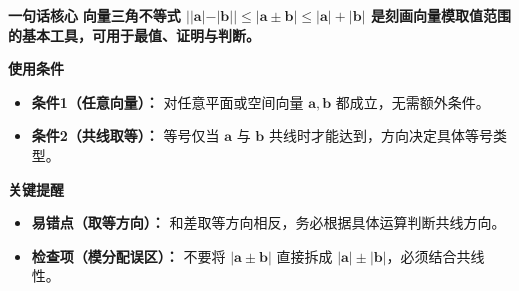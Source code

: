 \begin{summarybox}
	\textbf{\textcolor{CSummary}{一句话核心}}
	\textbf{向量三角不等式 $||\mathbf{a}|-|\mathbf{b}||\le|\mathbf{a}\pm\mathbf{b}|\le|\mathbf{a}|+|\mathbf{b}|$ 是刻画向量模取值范围的基本工具，可用于最值、证明与判断。}

	\medskip
	\textbf{\textcolor{CSummary}{使用条件}}
	\begin{itemize}[leftmargin=*, itemsep=0.5em, topsep=0.4em]
		\item \textbf{条件1（任意向量）：} 对任意平面或空间向量 $\mathbf{a},\mathbf{b}$ 都成立，无需额外条件。
		\item \textbf{条件2（共线取等）：} 等号仅当 $\mathbf{a}$ 与 $\mathbf{b}$ 共线时才能达到，方向决定具体等号类型。
	\end{itemize}

	\medskip
	\textbf{\textcolor{CSummary}{关键提醒}}
	\begin{itemize}[leftmargin=*, itemsep=0.5em, topsep=0.4em]
		\item \textbf{易错点（取等方向）：} 和差取等方向相反，务必根据具体运算判断共线方向。
		\item \textbf{检查项（模分配误区）：} 不要将 $|\mathbf{a}\pm\mathbf{b}|$ 直接拆成 $|\mathbf{a}|\pm|\mathbf{b}|$，必须结合共线性。
	\end{itemize}

\end{summarybox}

